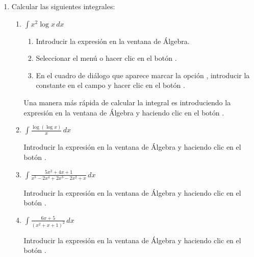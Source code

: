 \begin{enumerate}[leftmargin=*]
\item Calcular las siguientes integrales:
\begin{enumerate}
\item $ \int{x^2 \log x\,dx}$
\begin{indicacion}
\begin{enumerate}
\item Introducir la expresión  en la ventana de Álgebra.
\item Seleccionar el menú  o hacer clic en el botón .
\item En el cuadro de diálogo que aparece marcar la opción , introducir la constante  en el campo  y hacer clic en el botón .
\end{enumerate}
Una manera más rápida de calcular la integral es introduciendo la expresión  en la ventana de Álgebra y haciendo clic en el botón .
\end{indicacion}

\item $\displaystyle \int \frac{\log(\log x)}{x}\,dx$
\begin{indicacion}
Introducir la expresión  en la ventana de Álgebra y haciendo clic en el botón .
\end{indicacion}

\item $\displaystyle \int \frac{5x^{2}+4x+1}{x^{5}-2x^{4}+2x^{3}-2x^{2}+x}\,dx$
\begin{indicacion}
Introducir la expresión  en la ventana de Álgebra y haciendo clic en el botón .
\end{indicacion}

\item $\displaystyle \int \frac{6x+5}{(x^{2}+x+1)^{2}}\,dx$
\begin{indicacion}
Introducir la expresión  en la ventana de Álgebra y haciendo clic en el botón .
\end{indicacion}
\end{enumerate}



\end{enumerate}

